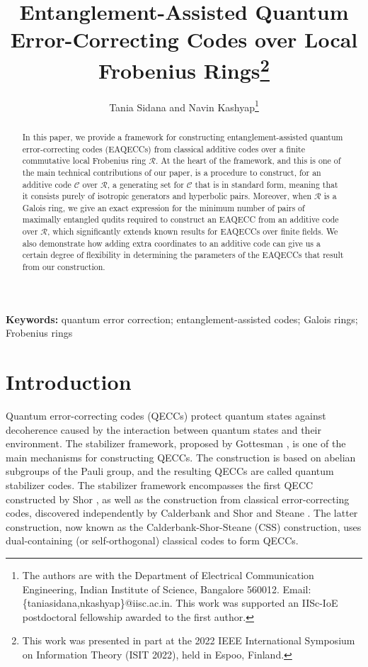 \documentclass{article}
\theoremstyle{remark}
\theoremstyle{definition}
\numberwithin{equation}{section}
\begin{document}
 
 
\title{\bf {Entanglement-Assisted Quantum Error-Correcting Codes over Local Frobenius Rings}\thanks{This work was presented in part at the 2022 IEEE International Symposium on Information Theory (ISIT 2022), held in Espoo, Finland.}}

\author{Tania Sidana and Navin Kashyap\thanks{The authors are with the Department of Electrical Communication Engineering, Indian Institute of Science, Bangalore 560012. Email: \{taniasidana,nkashyap\}@iisc.ac.in. This work was supported an IISc-IoE postdoctoral fellowship awarded to the first author.}}


\date{}
 
\maketitle 

 \begin{abstract} In this paper, we provide a framework for constructing entanglement-assisted quantum error-correcting codes (EAQECCs) from classical additive codes over a finite commutative local Frobenius ring $\mathcal{R}$. At the heart of the framework, and this is one of the main technical contributions of our paper, is a procedure to construct, for an additive code $\mathcal{C}$ over $\mathcal{R}$, a generating set for $\mathcal{C}$ that is in standard form, meaning that it consists purely of isotropic generators and hyperbolic pairs.  
Moreover, when $\mathcal{R}$ is a Galois ring, we give an exact expression for the minimum number of pairs of maximally entangled qudits required to construct an EAQECC from an additive code over $\mathcal{R}$, which significantly extends known results for EAQECCs over finite fields. We also demonstrate how adding extra coordinates to an additive code can give us a certain degree of flexibility in determining the parameters of the EAQECCs that result from our construction.
\end{abstract}

 {\bf Keywords:} { quantum error correction; entanglement-assisted codes; Galois rings; Frobenius rings}

 \section{Introduction}
Quantum error-correcting codes (QECCs) protect quantum states against decoherence caused by the interaction between quantum states and their environment. The stabilizer framework, proposed by Gottesman \cite{gottesman}, is one of the main mechanisms for constructing QECCs. The construction is based on abelian subgroups of the Pauli group, and the resulting QECCs are called quantum stabilizer codes. The stabilizer framework encompasses the first QECC constructed by Shor \cite{shor}, as well as the construction from classical error-correcting codes, discovered independently by Calderbank and Shor \cite{calderbank} and Steane \cite{steane}. The latter construction, now known as the Calderbank-Shor-Steane (CSS) construction, uses dual-containing (or self-orthogonal) classical codes to form QECCs. 
\end{document}
